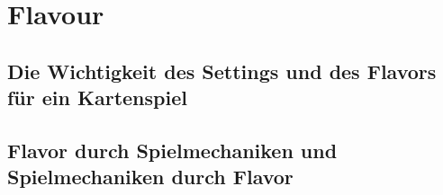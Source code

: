 
\section{Flavour}\label{sec:flavour}

\renewcommand{\kapitelautor}{Autor: Irgendwer} %

\subsection{Die Wichtigkeit des Settings und des Flavors für ein Kartenspiel}\label{subsec:wichtigkeit-des-flavours}

%
%

\subsection{Flavor durch Spielmechaniken und Spielmechaniken durch Flavor}\label{subsec:flavour-durch-mechaniken}

%
%

\renewcommand{\kapitelautor}{}

